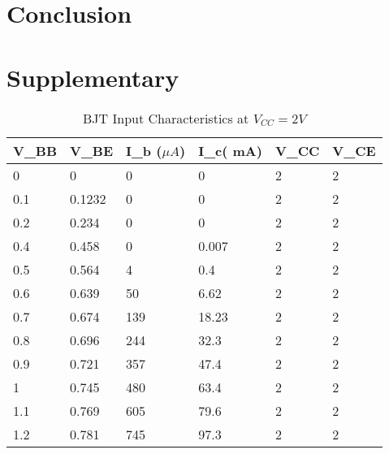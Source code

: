 \documentclass{scrartcl}
\newcommand{\1}{\mathbbm{1}}
\begin{document}
\section{Conclusion}
\pagebreak
\section{Supplementary}
\label{sec:supplementary}
\begin{table}[!ht]
        \centering
        \begin{tabular}{|l|l|l|l|l|l|}
        \hline
            \textbf{V\_BB} & \textbf{V\_BE} & \textbf{I\_b ($\mu A$)} & \textbf{I\_c( mA)} & \textbf{V\_CC} & \textbf{V\_CE} \\ \hline
            0 & 0 & 0 & 0 & 2 & 2 \\ \hline
            0.1 & 0.1232 & 0 & 0 & 2 & 2 \\ \hline
            0.2 & 0.234 & 0 & 0 & 2 & 2 \\ \hline
            0.4 & 0.458 & 0 & 0.007 & 2 & 2 \\ \hline
            0.5 & 0.564 & 4 & 0.4 & 2 & 2 \\ \hline
            0.6 & 0.639 & 50 & 6.62 & 2 & 2 \\ \hline
            0.7 & 0.674 & 139 & 18.23 & 2 & 2 \\ \hline
            0.8 & 0.696 & 244 & 32.3 & 2 & 2 \\ \hline
            0.9 & 0.721 & 357 & 47.4 & 2 & 2 \\ \hline
            1 & 0.745 & 480 & 63.4 & 2 & 2 \\ \hline
            1.1 & 0.769 & 605 & 79.6 & 2 & 2 \\ \hline
            1.2 & 0.781 & 745 & 97.3 & 2 & 2 \\ \hline
        \end{tabular}
        \caption{BJT Input Characteristics at $V_{CC} = 2V$}
        \label{tab:input2v}
    \end{table}
\end{document}
